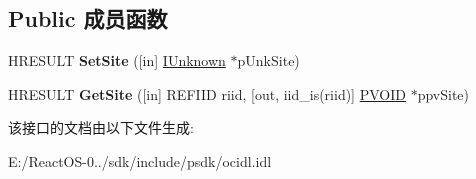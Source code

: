 \subsection*{Public 成员函数}
\begin{DoxyCompactItemize}
\item 
\mbox{\label{interface_i_object_with_site_af99c7baa5d869e7408f4fd6bdb7b8bdf}} 
H\+R\+E\+S\+U\+LT {\bfseries Set\+Site} (\mbox{[}in\mbox{]} \hyperlink{interface_i_unknown}{I\+Unknown} $\ast$p\+Unk\+Site)
\item 
\mbox{\label{interface_i_object_with_site_a9036b20635b610e2ed8c49573b87651f}} 
H\+R\+E\+S\+U\+LT {\bfseries Get\+Site} (\mbox{[}in\mbox{]} R\+E\+F\+I\+ID riid, \mbox{[}out, iid\+\_\+is(riid)\mbox{]} \hyperlink{interfacevoid}{P\+V\+O\+ID} $\ast$ppv\+Site)
\end{DoxyCompactItemize}


该接口的文档由以下文件生成\+:\begin{DoxyCompactItemize}
\item 
E\+:/\+React\+O\+S-\/0../sdk/include/psdk/ocidl.\+idl\end{DoxyCompactItemize}
